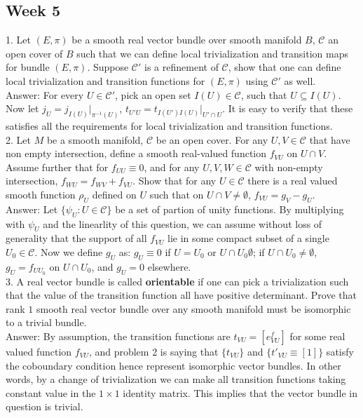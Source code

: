 \documentclass{article}
\theoremstyle{definition}
\begin{document}
\subsection{Week 5}

1. Let $(E, \pi)$ be a smooth real vector bundle over smooth manifold $B$, $\mathcal{C}$ an open cover of $B$ such that we can define local trivialization and transition maps for bundle $(E, \pi)$. Suppose $\mathcal{C}'$ is a refinement of $\mathcal{C}$, show that one can define local trivialization and transition functions for $(E, \pi)$ using $\mathcal{C}'$ as well.\\

Answer: For every $U\in \mathcal{C'}$, pick an open set $I(U)\in\mathcal{C}$, such that $U\subseteq I(U)$. Now let $j_U=j_{I(U)}|_{\pi^{-1}(U)}$, $t_{U'U}=t_{I(U')I(U)}|_{U'\cap U}$. It is easy to verify that these satisfies all the requirements for local trivialization and transition functions.\\ 

2. Let $M$ be a smooth manifold, $\mathcal{C}$ be an open cover. For any $U, V\in \mathcal{C}$ that have non empty intersection, define a smooth real-valued function $f_{VU}$ on $U\cap V$. Assume further that for $f_{UU}\equiv 0$, and for any $U, V, W\in \mathcal{C}$ with non-empty intersection, $f_{WU}=f_{WV}+f_{VU}$. Show that for any $U\in \mathcal{C}$ there is a real valued smooth function $\rho_U$ defined on $U$ such that on $U\cap V\not=\emptyset$, $f_{VU}=g_V-g_U$.\\

Answer: Let $\{\psi_U: U\in\mathcal{C}\}$ be a set of partion of unity functions. By multiplying with $\psi_U$ and the linearlity of this question, we can assume without loss of generality that the support of all $f_{VU}$ lie in some compact subset of a single $U_0\in\mathcal{C}$. Now we define $g_U$ as: $g_U\equiv 0$ if $U=U_0$ or $U\cap U_0\emptyset$; if $U\cap U_0\not=\emptyset$, $g_U=f_{UU_0}$ on $U\cap U_0$, and $g_U=0$ elsewhere.\\

3. A real vector bundle is called {\bf orientable} if one can pick a trivialization such that the value of the transition function all have positive determinant. Prove that rank $1$ smooth real vector bundle over any smooth manifold must be isomorphic to a trivial bundle.\\

Answer: By assumption, the transition functions are $t_{VU}=[e^f_{VU}]$ for some real valued function $f_{VU}$, and problem 2 is saying that $\{t_{VU}\}$ and $\{t'_{VU}\equiv [1]\}$ satisfy the coboundary condition hence represent isomorphic vector bundles. In other words, by a change of trivialization we can make all transition functions taking constant value in the $1\times 1$ identity matrix. This implies that the vector bundle in question is trivial.
\end{document}
